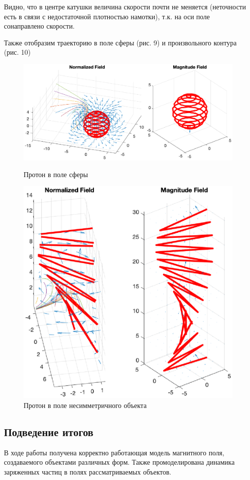 \documentclass[12pt,a4paper]{article}
\begin{document}
Видно, что в центре катушки величина скорости почти не меняется (неточности есть в связи с недостаточной плотностью намотки), т.к. на оси поле сонаправлено скорости.

Также отобразим траекторию в поле сферы (рис. 9) и произвольного контура (рис. 10)

\begin{figure}[H]
    \centering
    \includegraphics[width=\linewidth]{pics/sphere+q.eps}
    \caption{Протон в поле сферы}
    \includegraphics[width=0.9\linewidth]{pics/gen+q.eps}
    \caption{Протон в поле несимметричного объекта}
\end{figure}
\subsection*{Подведение итогов}
В ходе работы получена корректно работающая модель магнитного поля, создаваемого объектами различных форм.
Также промоделирована динамика заряженных частиц в полях рассматриваемых объектов.
\end{document}
